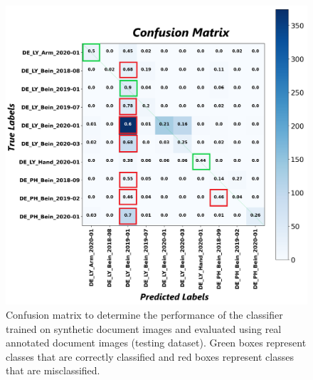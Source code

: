 \begin{figure}[H]
    \begin{center}
	\includegraphics[scale=0.20]{images/Evaluation/Confusion_Matrix_Synthetic_Data_Classifier_2021-05-31_16-40-33.png}
	\caption[Confusion matrix to determine the performance of the classifier trained on synthetic document images and evaluated using real annotated document images (test dataset).]{Confusion matrix to determine the performance of the classifier trained on synthetic document images and evaluated using real annotated document images (testing dataset). Green boxes represent classes that are correctly classified and red boxes represent classes that are misclassified.}
	\label{fig:CMSyntheticDocumentImagesClassifier}
	\end{center}
\end{figure}

